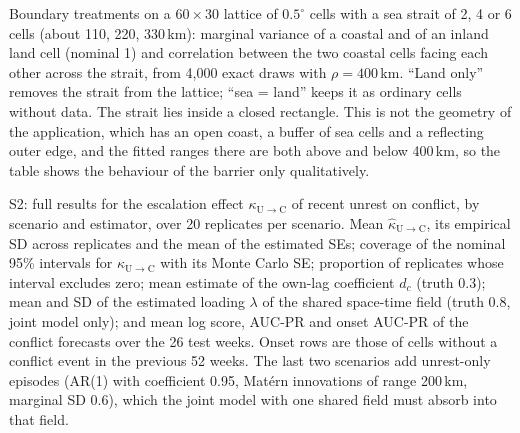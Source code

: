 \documentclass[aoas,preprint]{imsart}\def\IMSfallback{0}%
\numberwithin{equation}{section}
\theoremstyle{plain}
\theoremstyle{definition}
\newcommand{\kUC}{\kappa_{\mathrm{U}\to\mathrm{C}}}
\newcommand{\hkUC}{\hat\kappa_{\mathrm{U}\to\mathrm{C}}}
\begin{document}
\begin{table}
\caption{Boundary treatments on a $60 \times 30$ lattice of $0.5^\circ$ cells with
a sea strait of 2, 4 or 6 cells (about 110, 220, 330\,km): marginal variance of a
coastal and of an inland land cell (nominal 1) and correlation between the two
coastal cells facing each other across the strait, from 4{,}000 exact draws with
$\rho = 400$\,km. ``Land only'' removes the strait from the lattice; ``sea = land''
keeps it as ordinary cells without data. The strait lies inside a closed rectangle.
This is not the geometry of the application, which has an open coast, a buffer of sea
cells and a reflecting outer edge, and the fitted ranges there are both above and
below 400\,km, so the table shows the behaviour of the barrier only
qualitatively.}\label{tab:barrier}
\centering\small

\end{table}

\begin{table}
\caption{S2: full results for the escalation effect $\kUC$ of recent unrest on
conflict, by scenario and estimator, over 20 replicates per scenario. Mean
$\hkUC$, its empirical SD across replicates and the mean of the estimated SEs;
coverage of the nominal 95\% intervals for $\kUC$ with its Monte Carlo SE;
proportion of replicates whose interval excludes zero; mean estimate of the own-lag
coefficient $d_c$ (truth 0.3); mean and SD of the estimated loading $\lambda$ of the
shared space-time field (truth 0.8, joint model only); and mean log score, AUC-PR and
onset AUC-PR of the conflict forecasts over the 26 test weeks. Onset rows are those of
cells without a conflict event in the previous 52 weeks. The last two scenarios add
unrest-only episodes (AR(1) with coefficient 0.95, Mat\'ern innovations of range
200\,km, marginal SD 0.6), which the joint model with one shared field must absorb
into that field.}\label{tab:s5}
\centering\small
\resizebox{\textwidth}{!}{}
\end{table}
\end{document}
